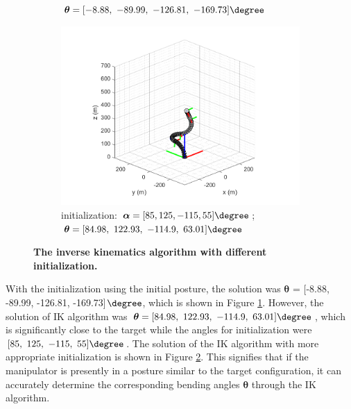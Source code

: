 \begin{figure}[H]
\begin{subfigure}{0.49\textwidth}
{        $\boldsymbol{\theta} = [-8.88,\ -89.99,\ -126.81,\ -169.73]\degree$ }
        \label{fig:complex_init_0_0_0_0}
    \end{subfigure}
    \begin{subfigure}{0.49\textwidth} %
        \centering
        \includegraphics[width=\linewidth]{Image/MATLAB/manipulator_84.98_122.93_-114.9_63.01.png}
        \caption{\centering initialization: $\boldsymbol{\alpha} = [85, 125, -115, 55]\degree$; \\
        $\boldsymbol{\theta} = [84.98,\ 122.93,\ -114.9,\ 63.01]\degree$ }
        \label{fig:complex_init_85_125_-115_55}
    \end{subfigure}
    \caption[The kinematics model of manipulator with respective bending modules]
    {\centering \textbf{The inverse kinematics algorithm with different initialization.}}
    \label{fig:80_120_-120_90_diff_initial}
\end{figure}
\vspace{-5mm}
With the initialization using the initial posture, the solution was $\boldsymbol{\theta}$ = 
[-8.88, -89.99, -126.81, -169.73]$\degree$, which is shown in Figure \ref{fig:complex_init_0_0_0_0}. 
However, the solution of IK algorithm was $\boldsymbol{\theta} = [84.98,\ 122.93,\ -114.9,\ 63.01]\degree$, 
which is significantly close to the target while the angles for initialization were $[85,\ 125,\ -115,\ 55]\degree$. 
The solution of the IK algorithm with more appropriate initialization is shown in Figure 
\ref{fig:complex_init_85_125_-115_55}. This signifies that if the manipulator is presently in a posture similar 
to the target configuration, it can accurately determine the corresponding bending angles $\boldsymbol{\theta}$ through the 
IK algorithm.

